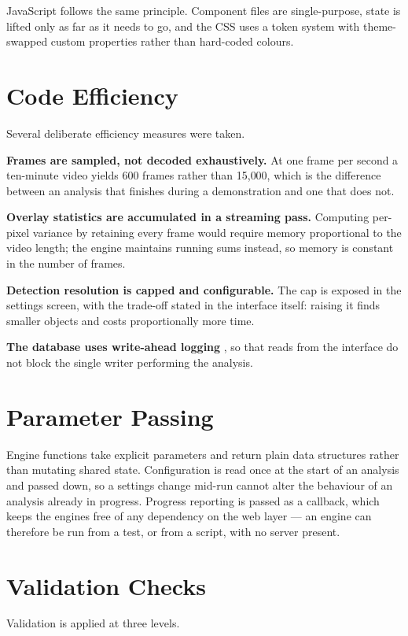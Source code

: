 \documentclass[
12pt,
a4paper,
oneside
]{report}
\begin{document}
JavaScript follows the same principle. Component files are single-purpose, state
is lifted only as far as it needs to go, and the CSS uses a token system with
theme-swapped custom properties rather than hard-coded colours.

\section{Code Efficiency}

Several deliberate efficiency measures were taken.

\textbf{Frames are sampled, not decoded exhaustively.} At one frame per second a
ten-minute video yields 600 frames rather than 15{,}000, which is the difference
between an analysis that finishes during a demonstration and one that does not.

\textbf{Overlay statistics are accumulated in a streaming pass.} Computing
per-pixel variance by retaining every frame would require memory proportional to
the video length; the engine maintains running sums instead, so memory is
constant in the number of frames.

\textbf{Detection resolution is capped and configurable.} The cap is exposed in
the settings screen, with the trade-off stated in the interface itself: raising
it finds smaller objects and costs proportionally more time.

\textbf{The database uses write-ahead logging} \cite{SQLiteWAL}, so that reads
from the interface do not block the single writer performing the analysis.

\section{Parameter Passing}

Engine functions take explicit parameters and return plain data structures
rather than mutating shared state. Configuration is read once at the start of an
analysis and passed down, so a settings change mid-run cannot alter the
behaviour of an analysis already in progress. Progress reporting is passed as a
callback, which keeps the engines free of any dependency on the web layer --- an
engine can therefore be run from a test, or from a script, with no server
present.

\section{Validation Checks}

Validation is applied at three levels.
\end{document}

